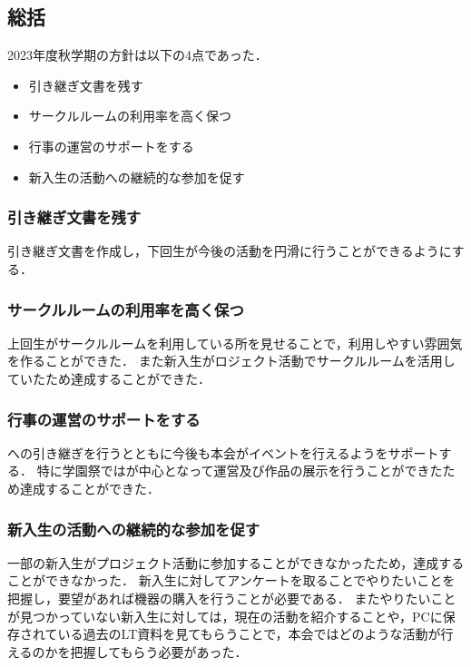 \subsection*{\thirdGrade{}総括}


2023年度秋学期の\thirdGrade{}方針は以下の4点であった．

\begin{itemize}
    \item 引き継ぎ文書を残す
    \item サークルルームの利用率を高く保つ
    \item 行事の運営のサポートをする
    \item 新入生の活動への継続的な参加を促す
\end{itemize}

\subsubsection*{引き継ぎ文書を残す}
引き継ぎ文書を作成し，下回生が今後の活動を円滑に行うことができるようにする．

\subsubsection*{サークルルームの利用率を高く保つ}
上回生がサークルルームを利用している所を見せることで，利用しやすい雰囲気を作ることができた．
また新入生がロジェクト活動でサークルルームを活用していたため達成することができた．

\subsubsection*{行事の運営のサポートをする}
\secondGrade{}への引き継ぎを行うとともに今後も本会がイベントを行えるよう\secondGrade{}をサポートする．
特に学園祭では\secondGrade{}が中心となって運営及び作品の展示を行うことができたため達成することができた．

\subsubsection*{新入生の活動への継続的な参加を促す}
一部の新入生がプロジェクト活動に参加することができなかったため，達成することができなかった．
新入生に対してアンケートを取ることでやりたいことを把握し，要望があれば機器の購入を行うことが必要である．
またやりたいことが見つかっていない新入生に対しては，現在の活動を紹介することや，PCに保存されている過去のLT資料を見てもらうことで，本会ではどのような活動が行えるのかを把握してもらう必要があった．
